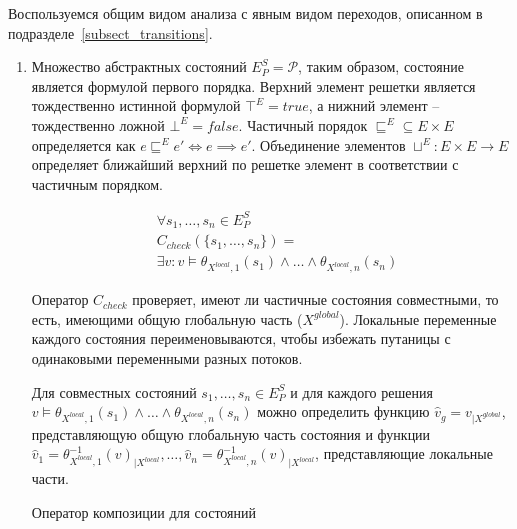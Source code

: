 Воспользуемся общим видом анализа с явным видом переходов, описанном в подразделе~\ref{subsect_transitions}.
 
\begin{enumerate}

\item 
Множество абстрактных состояний $E^S_P = \mathscr{P}$, таким образом, состояние является формулой первого порядка.
Верхний элемент решетки является тождественно истинной формулой
$\top^E = true$, а нижний элемент -- тождественно ложной $\bot^E = false$.
Частичный порядок $\sqsubseteq^E \subseteq E \times E$ определяется как $e \sqsubseteq^E e' \Leftrightarrow e \implies e'$.
Объединение элементов $\sqcup^E: E \times E \to E$ определяет ближайший верхний по решетке элемент в соответствии с частичным порядком.

\begin{equation}
\begin{aligned}
& \forall s_1, \dots, s_n \in E^S_P \\
& C_{check}(\{s_1,\dots, s_n\}) = \\
& \exists v: v \models \theta_{X^{local},1}(s_1) \land \dots \land \theta_{X^{local},n}(s_n)
\end{aligned}
\end{equation}

Оператор $C_{check}$ проверяет, имеют ли частичные состояния совместными, то есть, имеющими общую глобальную часть ($X^{global}$).
Локальные переменные каждого состояния переименовываются, чтобы избежать путаницы с одинаковыми переменными разных потоков.

Для совместных состояний $s_1, \dots, s_n \in E^S_P$ и для каждого решения 
$v \models \theta_{X^{local},1}(s_1) \land \dots \land \theta_{X^{local},n}(s_n)$
можно определить функцию $\hat v_g = v_{\mid X^{global}}$, представляющую общую глобальную часть состояния и функции $\hat v_1=\theta_{X^{local},1}^{-1}(v)_{\mid X^{local}}, \dots, \hat v_n=\theta_{X^{local},n}^{-1}(v)_{\mid X^{local}}$, представляющие локальные части.

Оператор композиции для состояний


\end{enumerate}
